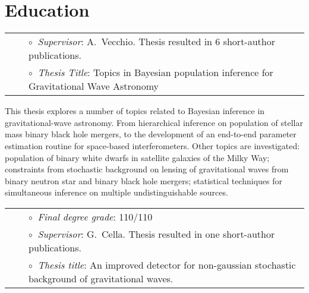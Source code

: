 \section{Education}

\vspace{-0.1cm}
\begin{tabular}{rcl}
&\hspace{0.4cm} &$\circ\;\;${\textit{Supervisor}}: A.~Vecchio. Thesis resulted in 6 short-author publications.
\\
&\hspace{0.4cm} &$\circ\;\;${\textit{Thesis Title}}:
Topics in Bayesian population inference for Gravitational Wave Astronomy
\end{tabular}
\vspace{0.2cm}

This thesis explores a number of topics related to Bayesian inference in gravitational-wave astronomy. From hierarchical inference on population of stellar mass binary black hole mergers, to the development of an end-to-end parameter estimation routine for space-based interferometers. Other topics are investigated: population of binary white dwarfs in satellite galaxies of the Milky Way; constraints from stochastic background on lensing of gravitational waves from binary neutron star and binary black hole mergers; statistical techniques for simultaneous inference on multiple undistinguishable sources.

\vspace{0.2cm}
\vspace{-0.1cm}
\begin{tabular}{rcl}
&\hspace{0.4cm} &$\circ\;\;${\textit{Final degree grade}}: 110/110\\
&\hspace{0.4cm} &$\circ\;\;${\textit{Supervisor}}: G.~Cella. Thesis resulted in one short-author publications.\\
&\hspace{0.4cm} &$\circ\;\;${\textit{Thesis title}}: An improved detector for non-gaussian stochastic background of gravitational waves.
\end{tabular}
\vspace{0.2cm}

